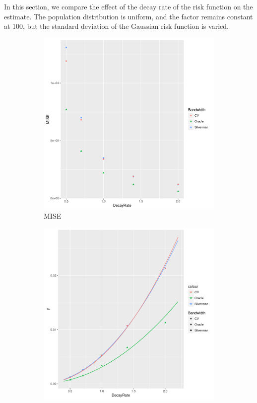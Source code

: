 In this section, we compare the effect of the decay rate of the risk function on the estimate.
The population distribution is uniform, and the \gls{factor} remains constant at 100, but
the standard deviation of the Gaussian risk function is varied.

\begin{figure}[htbp]
    \centering
    \begin{subfigure}[b]{0.3\textwidth}
    \includegraphics[width=\textwidth]{results/by_cases_decay/MISE-vs-risk-decay}
    \caption{MISE}
    \end{subfigure}
    \begin{subfigure}[b]{0.3\textwidth}
    \includegraphics[width=\textwidth]{results/by_cases_decay/RMISE-vs-risk-decay}

\end{subfigure}
\end{figure}
